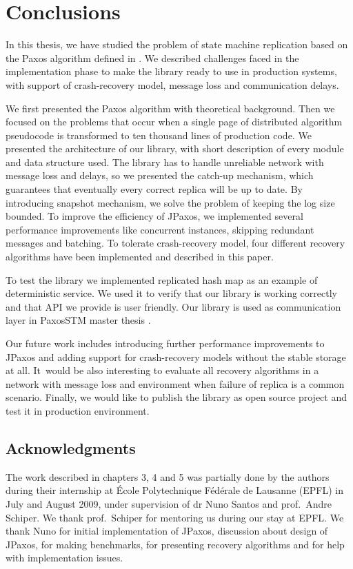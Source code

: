 \chapter{Conclusions}

In this thesis, we have studied the problem of state machine replication based
on the Paxos algorithm defined in \cite{Lam98}. We described challenges faced in
the implementation phase to make the library ready to use in production systems,
with support of crash-recovery model, message loss and communication delays.

We first presented the Paxos algorithm with theoretical background. Then we
focused on the problems that occur when a single page of distributed algorithm
pseudocode is transformed to ten thousand lines of production code. We
presented the architecture of our library, with short description of every
module and data structure used. The library has to handle unreliable network
with message loss and delays, so we presented the catch-up mechanism, which
guarantees that eventually every correct replica will be up to date. By
introducing snapshot mechanism, we solve the problem of keeping the log size
bounded. To improve the efficiency of JPaxos, we implemented several
performance improvements like concurrent instances, skipping redundant messages
and batching. To tolerate crash-recovery model, four different recovery
algorithms have been implemented and described in this paper.

To test the library we implemented replicated hash map as an example of
deterministic service. We used it to verify that our library is working
correctly and that API we provide is user friendly. Our library is used as 
communication layer in PaxosSTM master thesis \cite{Tad10}.

Our future work includes introducing further performance improvements to JPaxos
and adding support for crash-recovery models without the stable storage at all.
It~would be also interesting to evaluate all recovery algorithms in a network
with message loss and environment when failure of replica is a common scenario.
Finally, we would like to publish the library as open source project and test
it in production environment.

\section*{Acknowledgments}

The work described in chapters 3, 4 and 5 was partially done by the authors during
their internship at École Polytechnique Fédérale de Lausanne (EPFL) in July and
August 2009, under supervision of dr Nuno Santos and prof.\ Andre Schiper. We
thank prof.\ Schiper for mentoring us during our stay at EPFL. We thank Nuno for
initial implementation of JPaxos, discussion about design of JPaxos, for making
benchmarks, for presenting recovery algorithms and for help with implementation
issues.

